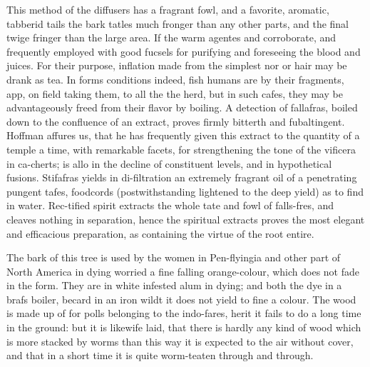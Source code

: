 This method of the diffusers has a fragrant fowl, and a favorite, aromatic, tabberid tails the bark tatles much fronger than any other parts, and the final twige fringer than the large area. If the warm agentes and corroborate, and frequently employed with good fucsels for purifying and foreseeing the blood and juices. For their purpose, inflation made from the simplest nor or hair may be drank as tea. In forms conditions indeed, fish humans are by their fragments, app, on field taking them, to all the the herd, but in such cafes, they may be advantageously freed from their flavor by boiling. A detection of fallafras, boiled down to the confluence of an extract, proves firmly bitterth and fubaltingent. Hoffman affures us, that he has frequently given this extract to the quantity of a temple a time, with remarkable facets, for strengthening the tone of the vificera in ca-cherts; is allo in the decline of constituent levels, and in hypothetical fusions. Stifafras yields in di-filtration an extremely fragrant oil of a penetrating pungent tafes, foodcords (postwithstanding lightened to the deep yield) as to find in water. Rec-tified spirit extracts the whole tate and fowl of falls-fres, and cleaves nothing in separation, hence the spiritual extracts proves the most elegant and efficacious preparation, as containing the virtue of the root entire.\par\medskip
The bark of this tree is used by the women in Pen-flyingia and other part of North America in dying worried a fine falling orange-colour, which does not fade in the form. They are in white infested alum in dying; and both the dye in a brafs boiler, becard in an iron wildt it does not yield to fine a colour. The wood is made up of for polls belonging to the indo-fares, herit it fails to do a long time in the ground: but it is likewife laid, that there is hardly any kind of wood which is more stacked by worms than this way it is expected to the air without cover, and that in a short time it is quite worm-teaten through and through.\par\medskip
